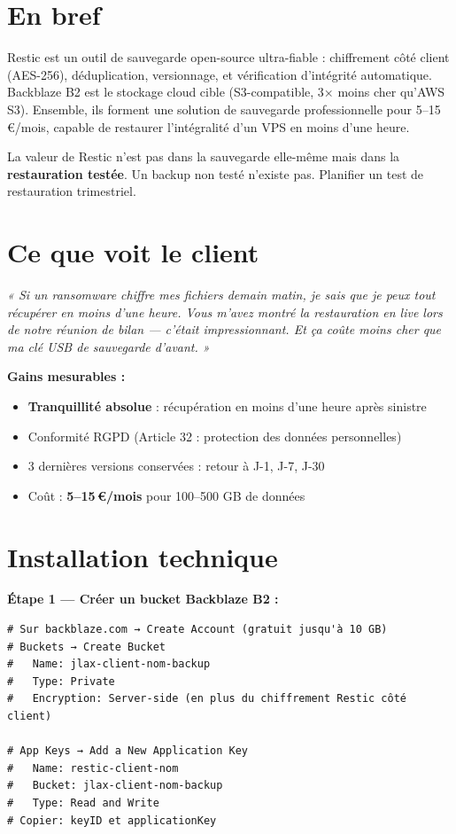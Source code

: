 \documentclass[11pt, a4paper]{article}
\begin{document}
\ficheHeader

\section*{En bref}
Restic est un outil de sauvegarde open-source ultra-fiable : chiffrement côté client (AES-256), déduplication, versionnage, et vérification d'intégrité automatique. Backblaze B2 est le stockage cloud cible (S3-compatible, 3× moins cher qu'AWS S3). Ensemble, ils forment une solution de sauvegarde professionnelle pour 5–15\,€/mois, capable de restaurer l'intégralité d'un VPS en moins d'une heure.

\begin{pointcle}
  La valeur de Restic n'est pas dans la sauvegarde elle-même mais dans la \textbf{restauration testée}. Un backup non testé n'existe pas. Planifier un test de restauration trimestriel.
\end{pointcle}

\section{Ce que voit le client}

\begin{clientbox}
  \textit{« Si un ransomware chiffre mes fichiers demain matin, je sais que je peux tout récupérer en moins d'une heure. Vous m'avez montré la restauration en live lors de notre réunion de bilan — c'était impressionnant. Et ça coûte moins cher que ma clé USB de sauvegarde d'avant. »}
\end{clientbox}

\textbf{Gains mesurables :}
\begin{itemize}
  \item \textbf{Tranquillité absolue} : récupération en moins d'une heure après sinistre
  \item Conformité RGPD (Article 32 : protection des données personnelles)
  \item 3 dernières versions conservées : retour à J-1, J-7, J-30
  \item Coût : \textbf{5–15\,€/mois} pour 100–500 GB de données
\end{itemize}

\section{Installation technique}

\textbf{Étape 1 — Créer un bucket Backblaze B2 :}
\begin{lstlisting}[style=terminal]
# Sur backblaze.com → Create Account (gratuit jusqu'à 10 GB)
# Buckets → Create Bucket
#   Name: jlax-client-nom-backup
#   Type: Private
#   Encryption: Server-side (en plus du chiffrement Restic côté client)

# App Keys → Add a New Application Key
#   Name: restic-client-nom
#   Bucket: jlax-client-nom-backup
#   Type: Read and Write
# Copier: keyID et applicationKey
\end{lstlisting}
\end{document}
